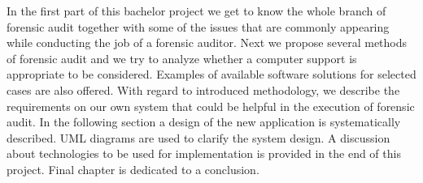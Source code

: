In the first part of this bachelor project we get to know the whole branch of forensic audit together with some of the issues that are commonly appearing while conducting the job of a forensic auditor. Next we propose several methods of forensic audit and we try to analyze whether a computer support is appropriate to be considered. Examples of available software solutions for selected cases are also offered. With regard to introduced methodology, we describe the requirements on our own system that could be helpful in the execution of forensic audit. In the following section a design of the new application is systematically described. UML diagrams are used to clarify the system design. A discussion about technologies to be used for implementation is provided in the end of this project. Final chapter is dedicated to a conclusion. 

























